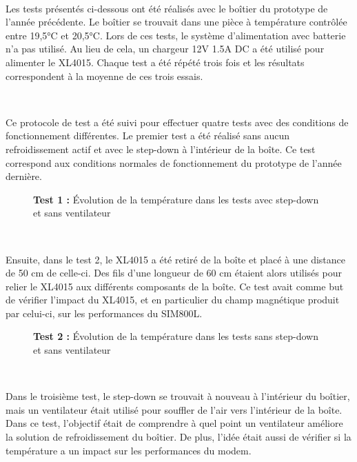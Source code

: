~


\noindent
Les tests présentés ci-dessous ont été réalisés avec le boîtier du prototype de l'année précédente. Le boîtier se trouvait dans une pièce à température contrôlée entre 19,5°C et 20,5°C. Lors de ces tests, le système d'alimentation avec batterie n'a pas utilisé. Au lieu de cela, un chargeur 12V 1.5A DC a été utilisé pour alimenter le XL4015. Chaque test a été répété trois fois et les résultats correspondent à la moyenne de ces trois essais.

~


\noindent
Ce protocole de test a été suivi pour effectuer quatre tests avec des conditions de fonctionnement différentes. Le premier test a été réalisé sans aucun refroidissement actif et avec le step-down à l'intérieur de la boîte. Ce test correspond aux conditions normales de fonctionnement du prototype de l'année dernière.



\begin{figure}[h!]
  \centering
  
  \label{fig:test_1}
  \vspace{-1cm}
  \caption{\textbf{Test 1 :} Évolution de la température dans les tests avec step-down et sans ventilateur}
\end{figure}

~

\noindent
Ensuite, dans le test 2, le XL4015 a été retiré de la boîte et placé à une distance de 50 cm de celle-ci. Des fils d'une longueur de 60 cm étaient alors utilisés pour relier le XL4015 aux différents composants de la boîte. Ce test avait comme but de vérifier l'impact du XL4015, et en particulier du champ magnétique produit par celui-ci, sur les performances du SIM800L.

\begin{figure}[ht!]
  \centering
  
  \label{fig:test_2}
  \vspace{-1cm}
  \caption{\textbf{Test 2 :} Évolution de la température dans les tests sans step-down et sans ventilateur}
\end{figure}

~

\noindent
Dans le troisième test, le step-down se trouvait à nouveau à l'intérieur du boîtier, mais un ventilateur était utilisé pour souffler de l'air vers l'intérieur de la boîte. Dans ce test, l'objectif était de comprendre à quel point un ventilateur améliore la solution de refroidissement du boîtier. De plus, l'idée était aussi de vérifier si la température a un impact sur les performances du modem.

